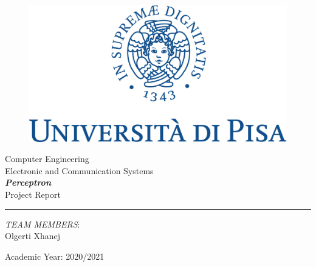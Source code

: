 \documentclass[a4paper, 12pt]{article}
\begin{document}
\begin{titlepage}
    \begin{center}
        \begin{figure}
            \includegraphics[width=\textwidth]{img/marchio_unipi_pant541-eps-converted-to.pdf}         
        \end{figure}
        {\Large
        Computer Engineering\\
        \vspace{5mm} %
        Electronic and Communication Systems}\\
        \vspace{30mm} %
        {\Huge\textbf{\textit{Perceptron}}}\\
        \vspace{10mm} %
        {\Large Project Report}\\
        \par\noindent\rule{\textwidth}{0.4pt}
            \begin{flushright}
                \textit{TEAM MEMBERS}:\\
                Olgerti Xhanej\\
            \end{flushright}
            \vfill
        Academic Year: 2020/2021\\        
    \end{center}
\end{titlepage}    
\tableofcontents







\end{document}
